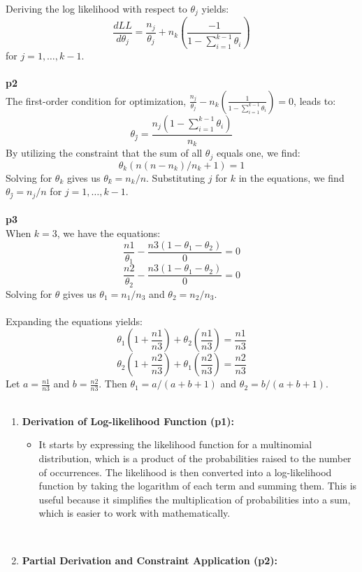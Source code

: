 \documentclass[12pt]{article}
\begin{document}
\begin{itemize}
\begin{itemize}
\begin{itemize}
{Deriving the log likelihood with respect to \( \theta_j \) yields:
\[ \frac{dLL}{d\theta_j} = \frac{n_j}{\theta_j} + n_k \left(\frac{-1}{1 - \sum_{i=1}^{k-1} \theta_i}\right) \]
for \( j = 1, \ldots, k-1 \).
\\ \\
\textbf{p2} \\
The first-order condition for optimization, \( \frac{n_j}{\theta_j} - n_k \left(\frac{1}{1 - \sum_{i=1}^{k-1} \theta_i}\right) = 0 \), leads to:
\[ \theta_j \hat{} = \frac{n_j(1 - \sum_{i=1}^{k-1} \theta_i)}{n_k} \]
By utilizing the constraint that the sum of all \( \theta_j \) equals one, we find:
\[ \theta_k(n(n-n_k)/n_k + 1) = 1 \]
Solving for \( \theta_k \) gives us \( \theta_k \hat{} = n_k/n \).
Substituting \( j \) for \( k \) in the equations, we find \( \theta_j \hat{} = n_j/n \) for \( j = 1, \ldots, k-1 \).
\\ \\
\textbf{p3} \\
When \( k = 3 \), we have the equations:
\[ \frac{n1}{\theta_1} - \frac{n3(1 - \theta_1 - \theta_2)}{0} = 0 \]
\[ \frac{n2}{\theta_2} - \frac{n3(1 - \theta_1 - \theta_2)}{0} = 0 \]
Solving for \( \theta \) gives us \( \theta_1 = n_1/n_3 \) and \( \theta_2 = n_2/n_3 \).
\\ \\
Expanding the equations yields:
\[ \theta_1 (1 + \frac{n1}{n3}) + \theta_2 (\frac{n1}{n3}) = \frac{n1}{n3} \]
\[ \theta_2 (1 + \frac{n2}{n3}) + \theta_1 (\frac{n2}{n3}) = \frac{n2}{n3} \]
Let \( a = \frac{n1}{n3} \) and \( b = \frac{n2}{n3} \). Then \( \theta_1 = a/(a+b+1) \) and \( \theta_2 = b/(a+b+1) \).
\\ \\
\begin{enumerate}
    \item \textbf{Derivation of Log-likelihood Function (p1):}
    \begin{itemize}
        \item It starts by expressing the likelihood function for a multinomial distribution, which is a product of the probabilities raised to the number of occurrences. The likelihood is then converted into a log-likelihood function by taking the logarithm of each term and summing them. This is useful because it simplifies the multiplication of probabilities into a sum, which is easier to work with mathematically.
    \end{itemize}
    \\
    \item \textbf{Partial Derivation and Constraint Application (p2):}

\end{enumerate}}
\end{itemize}
\end{itemize}
\end{itemize}
\end{document}
